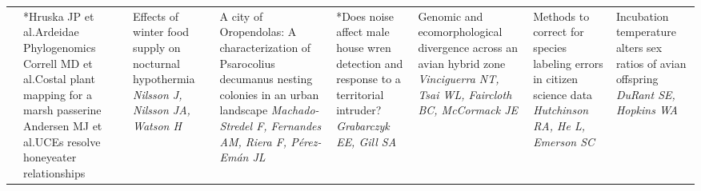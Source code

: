 \begin{tabular}{|x{0.85cm}|x{2.85cm}|x{2.85cm}|x{2.85cm}|x{2.85cm}|x{2.85cm}|a{2.85cm}|a{2.85cm}|}
&*Hruska JP  et al.\newline \tiny Ardeidae Phylogenomics \scriptsize\newline \newline Correll MD  et al.\newline \tiny Costal plant mapping for a marsh passerine \scriptsize\newline \newline Andersen MJ  et al.\newline \tiny UCEs resolve honeyeater relationships \scriptsize & Effects of winter food supply on nocturnal hypothermia \newline \newline \textit{Nilsson J, Nilsson JA, Watson H} & A city of Oropendolas: A characterization of Psarocolius decumanus nesting colonies in an urban landscape \newline \newline \textit{Machado-Stredel F, Fernandes AM, Riera F, P\'{e}rez-Em\'{a}n JL} & *Does noise affect male house wren detection and response to a territorial intruder? \newline \newline \textit{Grabarczyk EE, Gill SA} & Genomic and ecomorphological divergence across an avian hybrid zone \newline \newline \textit{Vinciguerra NT, Tsai WL, Faircloth BC, McCormack JE} & Methods to correct for species labeling errors in citizen science data \newline \newline \textit{Hutchinson RA, He L, Emerson SC} & Incubation temperature alters sex ratios of avian offspring \newline \newline \textit{DuRant SE, Hopkins WA}\\

\end{tabular}
